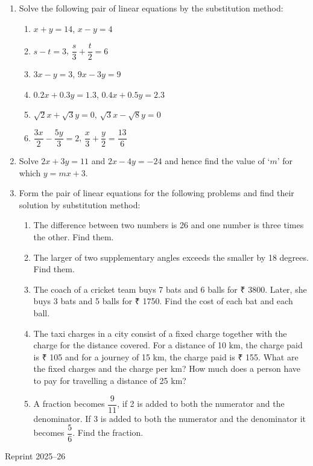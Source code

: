 \documentclass[12pt]{article}
\begin{document}
\begin{enumerate}
    \item Solve the following pair of linear equations by the substitution method:
    \begin{enumerate}
        \item $x + y = 14$, \quad $x - y = 4$
        \item $s - t = 3$, \quad $\dfrac{s}{3} + \dfrac{t}{2} = 6$
        \item $3x - y = 3$, \quad $9x - 3y = 9$
        \item $0.2x + 0.3y = 1.3$, \quad $0.4x + 0.5y = 2.3$
        \item $\sqrt{2}x + \sqrt{3}y = 0$, \quad $\sqrt{3}x - \sqrt{8}y = 0$
        \item $\dfrac{3x}{2} - \dfrac{5y}{3} = 2$, \quad $\dfrac{x}{3} + \dfrac{y}{2} = \dfrac{13}{6}$
    \end{enumerate}

    \item Solve $2x + 3y = 11$ and $2x - 4y = -24$ and hence find the value of ‘$m$’ for which $y = mx + 3$.

    \item Form the pair of linear equations for the following problems and find their solution by substitution method:
    \begin{enumerate}
        \item The difference between two numbers is 26 and one number is three times the other. Find them.
        \item The larger of two supplementary angles exceeds the smaller by 18 degrees. Find them.
        \item The coach of a cricket team buys 7 bats and 6 balls for ₹ 3800. Later, she buys 3 bats and 5 balls for ₹ 1750. Find the cost of each bat and each ball.
        \item The taxi charges in a city consist of a fixed charge together with the charge for the distance covered. For a distance of 10 km, the charge paid is ₹ 105 and for a journey of 15 km, the charge paid is ₹ 155. What are the fixed charges and the charge per km? How much does a person have to pay for travelling a distance of 25 km?
        \item A fraction becomes $\dfrac{9}{11}$, if 2 is added to both the numerator and the denominator. If 3 is added to both the numerator and the denominator it becomes $\dfrac{5}{6}$. Find the fraction.
    \end{enumerate}
\end{enumerate}

\vfill
\begin{center}
Reprint 2025–26
\end{center}
\end{document}
